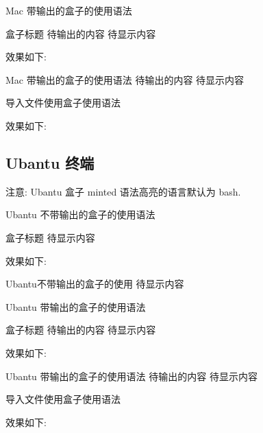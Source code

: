       \begin{Code}[LaTeX]{Mac 带输出的盒子的使用语法}
        \begin{MacOutput}[minted高亮的语言]{盒子标题}{
          待输出的内容
        }
          待显示内容
        \end{MacOutput}
      \end{Code}
      效果如下:
      \begin{MacOutput}{Mac 带输出的盒子的使用语法}{
        待输出的内容
      }
        待显示内容
      \end{MacOutput}

      \begin{Code}[LaTeX]{导入文件使用盒子使用语法}
      \end{Code}
      效果如下:

  \subsection{Ubantu 终端} \label{sbsec:Ubantu 终端}
    注意: Ubantu 盒子 minted 语法高亮的语言默认为 bash.

      \begin{Code}[latex][][LaTeX]{Ubantu 不带输出的盒子的使用语法}
        \begin{Git}[minted高亮的语言]{盒子标题}
          待显示内容
        \end{Git}
      \end{Code}
      效果如下:
      \begin{Git}{Ubantu不带输出的盒子的使用}
        待显示内容
      \end{Git}

      \begin{Code}[LaTeX]{Ubantu 带输出的盒子的使用语法}
        \begin{GitOutput}[minted高亮的语言]{盒子标题}{
          待输出的内容
        }
          待显示内容
        \end{GitOutput}
      \end{Code}
      效果如下:
      \begin{GitOutput}{Ubantu 带输出的盒子的使用语法}{
        待输出的内容
      }
        待显示内容
      \end{GitOutput}

      \begin{Code}[LaTeX]{导入文件使用盒子使用语法}
      \end{Code}
      效果如下:

